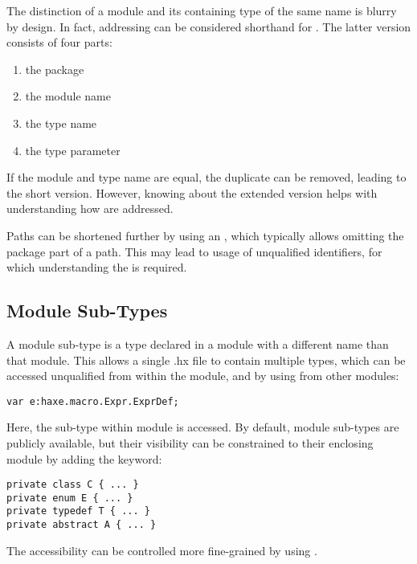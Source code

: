 \documentclass{haxe}
\begin{document}
The distinction of a module and its containing type of the same name is blurry by design. In fact, addressing  can be considered shorthand for . The latter version consists of four parts:

\begin{enumerate}
	\item the package 
	\item the module name 
	\item the type name 
	\item the type parameter 
\end{enumerate}
If the module and type name are equal, the duplicate can be removed, leading to the  short version. However, knowing about the extended version helps with understanding how  are addressed.

Paths can be shortened further by using an , which typically allows omitting the package part of a path. This may lead to usage of unqualified identifiers, for which understanding the  is required.



\subsection{Module Sub-Types}
\label{type-system-module-sub-types}

A module sub-type is a type declared in a module with a different name than that module. This allows a single .hx file to contain multiple types, which can be accessed unqualified from within the module, and by using  from other modules:

\begin{lstlisting}
var e:haxe.macro.Expr.ExprDef;
\end{lstlisting}
Here, the sub-type  within module  is accessed. By default, module sub-types are publicly available, but their visibility can be constrained to their enclosing module by adding the  keyword:

\begin{lstlisting}
private class C { ... }
private enum E { ... }
private typedef T { ... }
private abstract A { ... }
\end{lstlisting}
The accessibility can be controlled more fine-grained by using .
\end{document}

